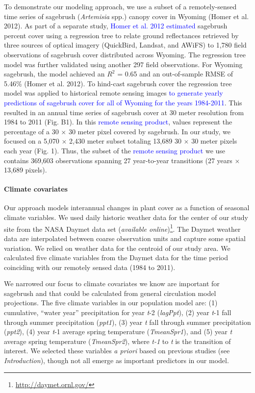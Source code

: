 \documentclass[12pt,]{article}
\let\oldparagraph\paragraph
\renewcommand{\paragraph}[1]{\oldparagraph{#1}\mbox{}}
\let\rmarkdownfootnote\footnote%
\def\footnote{\protect\rmarkdownfootnote}
\begin{document}
To demonstrate our modeling approach, we use a subset of a
remotely-sensed time series of sagebrush (\emph{Artemisia} spp.) canopy
cover in Wyoming (Homer et al. 2012). As part of a separate study,
\textcolor{blue}{Homer et al. 2012 estimated} sagebrush percent cover
using a regression tree to relate ground reflectances retrieved by three
sources of optical imagery (QuickBird, Landsat, and AWiFS) to 1,780
field observations of sagebrush cover distributed across Wyoming. The
regression tree model was further validated using another 297 field
observations. For Wyoming sagebrush, the model achieved an \(R^{2}\) =
0.65 and an out-of-sample RMSE of 5.46\% (Homer et al. 2012). To
hind-cast sagebrush cover the regression tree model was applied to
historical remote sensing images
\textcolor{blue}{to generate yearly predictions of sagebrush cover for all of Wyoming for the years 1984-2011}.
This resulted in an annual time series of sagebrush cover at 30 meter
resolution from 1984 to 2011 (Fig. B1). In this
\textcolor{blue}{remote sensing product}, values represent the
percentage of a 30 \(\times\) 30 meter pixel covered by sagebrush. In
our study, we focused on a 5,070 \(\times\) 2,430 meter subset totaling
13,689 30 \(\times\) 30 meter pixels each year (Fig. 1). Thus, the
subset of the \textcolor{blue}{remote sensing product} we use contains
369,603 observations spanning 27 year-to-year transitions (27 years
\(\times\) 13,689 pixels).

\paragraph{Climate covariates}\label{climate-covariates}

Our approach models interannual changes in plant cover as a function of
seasonal climate variables. We used daily historic weather data for the
center of our study site from the NASA Daymet data set (\emph{available
online})\footnote{\url{http://daymet.ornl.gov/}}. The Daymet weather
data are interpolated between coarse observation units and capture some
spatial variation. We relied on weather data for the centroid of our
study area. We calculated five climate variables from the Daymet data
for the time period coinciding with our remotely sensed data (1984 to
2011).

We narrowed our focus to climate covariates we know are important for
sagebrush and that could be calculated from general circulation model
projections. The five climate variables in our population model are: (1)
cumulative, ``water year'' precipitation for year \emph{t}-2
(\emph{lagPpt}), (2) year \emph{t}-1 fall through summer precipitation
(\emph{ppt1}), (3) year \emph{t} fall through summer precipitation
(\emph{ppt2}), (4) year \emph{t}-1 average spring temperature
(\emph{TmeanSpr1}), and (5) year \emph{t} average spring temperature
(\emph{TmeanSpr2}), where \emph{t-1} to \emph{t} is the transition of
interest. We selected these variables \emph{a priori} based on previous
studies (see \emph{Introduction}), though not all emerge as important
predictors in our model.
\end{document}
